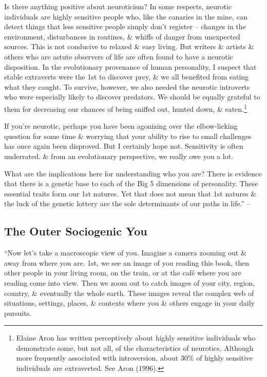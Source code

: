 \documentclass{article}
\numberwithin{equation}{section}
\begin{document}
Is there anything positive about neuroticism? In some respects, neurotic individuals are highly sensitive people who, like the canaries in the mine, can detect things that less sensitive people simply don't register -- changes in the environment, disturbances in routines, \& whiffs of danger from unexpected sources. This is not conducive to relaxed \& easy living. But writers \& artists \& others who are astute observers of life are often found to have a neurotic disposition. In the evolutionary provenance of human personality, I suspect that stable extraverts were the 1st to discover prey, \& we all benefited from eating what they caught. To survive, however, we also needed the neurotic introverts who were especially likely to discover predators. We should be equally grateful to them for decreasing our chances of being sniffed out, hunted down, \& eaten.\footnote{Elaine Aron has written perceptively about highly sensitive individuals who demonstrate some, but not all, of the characteristics of neurotics. Although more frequently associated with introversion, about 30\% of highly sensitive individuals are extraverted. See Aron (1996).}

If you're neurotic, perhaps you have been agonizing over the elbow-licking question for some time \& worrying that your ability to rise to small challenges has once again been disproved. But I certainly hope not. Sensitivity is often underrated. \& from an evolutionary perspective, we really owe you a lot.

What are the implications here for understanding who you are? There is evidence that there is a genetic base to each of the Big 5 dimensions of personality. These essential traits form our 1st natures. Yet that does not mean that 1st natures \& the luck of the genetic lottery are the sole determinants of our paths in life.'' -- \cite[pp. 19--20]{Little2017}

\subsection{The Outer Sociogenic You}
``Now let's take a macroscopic view of you. Imagine a camera zooming out \& away from where you are. 1st, we see an image of you reading this book, then other people in your living room, on the train, or at the caf\'e where you are reading come into view. Then we zoom out to catch images of your city, region, country, \& eventually the whole earth. These images reveal the complex web of situations, settings, places, \& contexts where you \& others engage in your daily pursuits.
\end{document}
